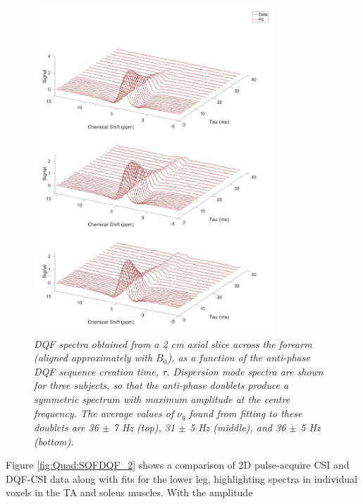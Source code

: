 \begin{figure}
    \centering
    \includegraphics[width=0.8\textwidth]{Figures/Quad/Bulk_DQF_2.png}
    \caption{\textit{\ac{DQF} spectra obtained from a 2 cm axial slice across the forearm (aligned approximately with $B_0$), as a function of the anti-phase \ac{DQF} sequence creation time, $\tau$. Dispersion mode spectra are shown for three subjects, so that the anti-phase doublets produce a symmetric spectrum with maximum amplitude at the centre frequency. The average values of $\nu_q$ found from fitting to these doublets are 36 $\pm$ 7 Hz (top), 31 $\pm$ 5 Hz (middle), and 36 $\pm$ 5 Hz (bottom).}}
    \label{fig:Quad:Bulk_DQF_2}
\end{figure}

Figure \ref{fig:Quad:SQFDQF_2} shows a comparison of 2D pulse-acquire \ac{CSI} and \ac{DQF}-\ac{CSI} data along with fits for the lower leg, highlighting spectra in individual voxels in the \ac{TA} and soleus muscles. With the amplitude 

